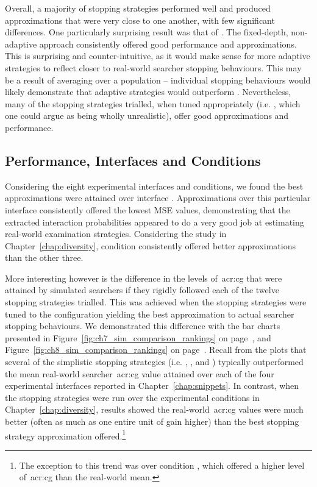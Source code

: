 Overall, a majority of stopping strategies performed well and produced approximations that were very close to one another, with few significant differences. One particularly surprising result was that of . The fixed-depth, non-adaptive approach consistently offered good performance and approximations. This is surprising and counter-intuitive, as it would make sense for more adaptive strategies to reflect closer to real-world searcher stopping behaviours. This may be a result of averaging over a population -- individual stopping behaviours would likely demonstrate that adaptive strategies would outperform . Nevertheless, many of the stopping strategies trialled, when tuned appropriately (i.e. , which one could argue as being wholly unrealistic), offer good approximations and performance.

\subsection{Performance, Interfaces and Conditions}
Considering the eight experimental interfaces and conditions, we found the best approximations were attained over interface . Approximations over this particular interface consistently offered the lowest MSE values, demonstrating that the extracted interaction probabilities appeared to do a very good job at estimating real-world examination strategies. Considering the study in Chapter~\ref{chap:diversity}, condition  consistently offered better approximations than the other three.

More interesting however is the difference in the levels of~\gls{acr:cg} that were attained by simulated searchers if they rigidly followed each of the twelve stopping strategies trialled. This was achieved when the stopping strategies were tuned to the configuration yielding the best approximation to actual searcher stopping behaviours. We demonstrated this difference with the bar charts presented in Figure~\ref{fig:ch7_sim_comparison_rankings} on page~\pageref{fig:ch7_sim_comparison_rankings}, and Figure~\ref{fig:ch8_sim_comparison_rankings} on page~\pageref{fig:ch8_sim_comparison_rankings}. Recall from the plots that several of the simplistic stopping strategies (i.e. , ,  and ) typically outperformed the mean real-world searcher~\gls{acr:cg} value attained over each of the four experimental interfaces reported in Chapter~\ref{chap:snippets}. In contrast, when the stopping strategies were run over the experimental conditions in Chapter~\ref{chap:diversity}, results showed the real-world~\gls{acr:cg} values were much better (often as much as one entire unit of gain higher) than the best stopping strategy approximation offered.\footnote{The exception to this trend was  over condition , which offered a higher level of~\gls{acr:cg} than the real-world mean.}

